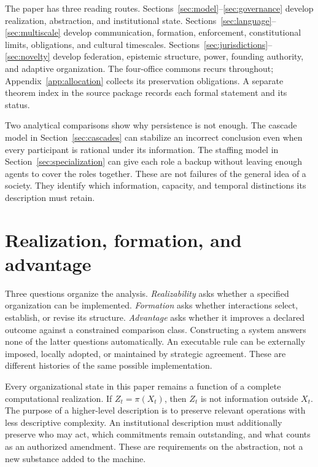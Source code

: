 \documentclass[11pt,letterpaper]{article}
\theoremstyle{plain}
\theoremstyle{definition}
\theoremstyle{remark}
\begin{document}
The paper has three reading routes. Sections~\ref{sec:model}--\ref{sec:governance} develop realization, abstraction, and institutional state. Sections~\ref{sec:language}--\ref{sec:multiscale} develop communication, formation, enforcement, constitutional limits, obligations, and cultural timescales. Sections~\ref{sec:jurisdictions}--\ref{sec:novelty} develop federation, epistemic structure, power, founding authority, and adaptive organization. The four-office commons recurs throughout; Appendix~\ref{app:allocation} collects its preservation obligations. A separate theorem index in the source package records each formal statement and its status.

Two analytical comparisons show why persistence is not enough. The cascade model in Section~\ref{sec:cascades} can stabilize an incorrect conclusion even when every participant is rational under its information. The staffing model in Section~\ref{sec:specialization} can give each role a backup without leaving enough agents to cover the roles together. These are not failures of the general idea of a society. They identify which information, capacity, and temporal distinctions its description must retain.

\section{Realization, formation, and advantage}\label{sec:scope}
Three questions organize the analysis. \emph{Realizability} asks whether a specified organization can be implemented. \emph{Formation} asks whether interactions select, establish, or revise its structure. \emph{Advantage} asks whether it improves a declared outcome against a constrained comparison class. Constructing a system answers none of the latter questions automatically. An executable rule can be externally imposed, locally adopted, or maintained by strategic agreement. These are different histories of the same possible implementation.

Every organizational state in this paper remains a function of a complete computational realization. If $Z_t=\pi(X_t)$, then $Z_t$ is not information outside $X_t$. The purpose of a higher-level description is to preserve relevant operations with less descriptive complexity. An institutional description must additionally preserve who may act, which commitments remain outstanding, and what counts as an authorized amendment. These are requirements on the abstraction, not a new substance added to the machine.
\end{document}
